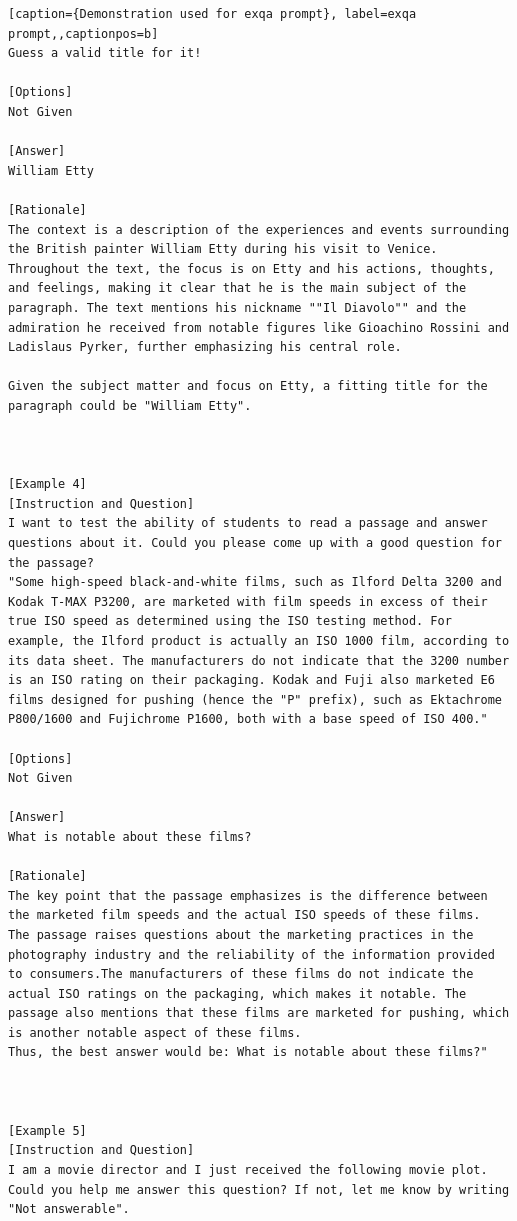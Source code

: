 \begin{lstlisting}[caption={Demonstration used for exqa prompt}, label=exqa prompt,,captionpos=b]
Guess a valid title for it!

[Options]
Not Given

[Answer]
William Etty

[Rationale]
The context is a description of the experiences and events surrounding the British painter William Etty during his visit to Venice. Throughout the text, the focus is on Etty and his actions, thoughts, and feelings, making it clear that he is the main subject of the paragraph. The text mentions his nickname ""Il Diavolo"" and the admiration he received from notable figures like Gioachino Rossini and Ladislaus Pyrker, further emphasizing his central role.

Given the subject matter and focus on Etty, a fitting title for the paragraph could be "William Etty".



[Example 4]
[Instruction and Question]
I want to test the ability of students to read a passage and answer questions about it. Could you please come up with a good question for the passage?
"Some high-speed black-and-white films, such as Ilford Delta 3200 and Kodak T-MAX P3200, are marketed with film speeds in excess of their true ISO speed as determined using the ISO testing method. For example, the Ilford product is actually an ISO 1000 film, according to its data sheet. The manufacturers do not indicate that the 3200 number is an ISO rating on their packaging. Kodak and Fuji also marketed E6 films designed for pushing (hence the "P" prefix), such as Ektachrome P800/1600 and Fujichrome P1600, both with a base speed of ISO 400."

[Options]
Not Given

[Answer]
What is notable about these films?

[Rationale]
The key point that the passage emphasizes is the difference between the marketed film speeds and the actual ISO speeds of these films.
The passage raises questions about the marketing practices in the photography industry and the reliability of the information provided to consumers.The manufacturers of these films do not indicate the actual ISO ratings on the packaging, which makes it notable. The passage also mentions that these films are marketed for pushing, which is another notable aspect of these films.
Thus, the best answer would be: What is notable about these films?"



[Example 5]
[Instruction and Question]
I am a movie director and I just received the following movie plot. 
Could you help me answer this question? If not, let me know by writing "Not answerable".


\end{lstlisting}
